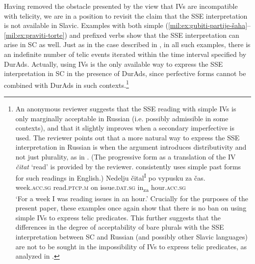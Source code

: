 \documentclass[output=paper,colorlinks,citecolor=brown]{langscibook}
\begin{document}
Having removed the obstacle presented by the view that IVs are incompatible with telicity, we are in a position to revisit the claim that the SSE interpretation is not available in Slavic. Examples with both simple (\ref{mil:ex:gubiti-partije-šaha}--\ref{mil:ex:praviti-torte}) and prefixed verbs  show that the SSE interpretation can arise in SC as well. Just as in the case described in \citet{MacDonald_2008}, in all such examples, there is an indefinite number of telic events iterated within the time interval specified by DurAds. Actually, using IVs is the only available way to express the SSE interpretation in SC in the presence of DurAds, since perfective forms cannot be combined with DurAds in such contexts.\footnote{An anonymous reviewer suggests that the SSE reading with simple IVs is only marginally acceptable in Russian (i.e. possibly admissible in some contexts), and that it slightly improves when a secondary imperfective is used. The reviewer points out that a more natural way to express the SSE interpretation in Russian is when the argument introduces distributivity and not just plurality, as in . (The progressive form as a translation of the IV \textit{čitat} `read' is provided by the reviewer. \citealt{MacDonald_2008} consistently uses simple past forms for such readings in English.) 
\ea \label{mil:ex:R1-Russian-distributivity}
\gll Nedelju čital\textsuperscript{I} po vypusku za čas.
\\ week.\textsc{acc.sg} read.\textsc{ptcp.m} on issue.\textsc{dat.sg} in\textsubscript{za} hour.\textsc{acc.sg}
     \\
\glt `For a week I was reading issues in an hour.'
\z 
Crucially for the purposes of the present paper, these examples once again show that there is no ban on using simple IVs to express telic predicates. This further suggests that the differences in the degree of acceptability of bare plurals with the SSE interpretation between SC and Russian (and possibly other Slavic languages) are not to be sought in the impossibility of IVs to express telic predicates, as analyzed in \citet{MacDonald_2008}.
} 
\end{document}
